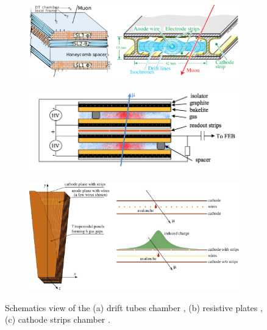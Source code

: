 \begin{figure}[H]
    \centering
    \begin{subfigure}[b]{.58\linewidth}
        
        \includegraphics[width=\linewidth]{fig//chap03-cms/drift_tubes.png}
        \label{fig:drift_tubes}
        \caption{}
    \end{subfigure}
    \begin{subfigure}[b]{.41\linewidth}
        
        \includegraphics[width=1\linewidth]{fig//chap03-cms/rpc.png}
        \caption{}
        \label{fig:rpc}
    \end{subfigure}
    \begin{subfigure}[b]{0.7\linewidth}
        \centering
        \includegraphics[width=1\linewidth]{fig//chap03-cms/csc.jpg}
        \caption{}
        \label{fig:csc}
    \end{subfigure}
    \caption{Schematics view of the (a) drift tubes chamber \cite{MuonExperiment}, (b) resistive plates \cite{EndcapReshufflingRpcTWiki}, (c) cathode strips chamber \cite{Acosta2008EfficiencyChambers}.}
    \label{fig:muons_technologies}
\end{figure}
    


